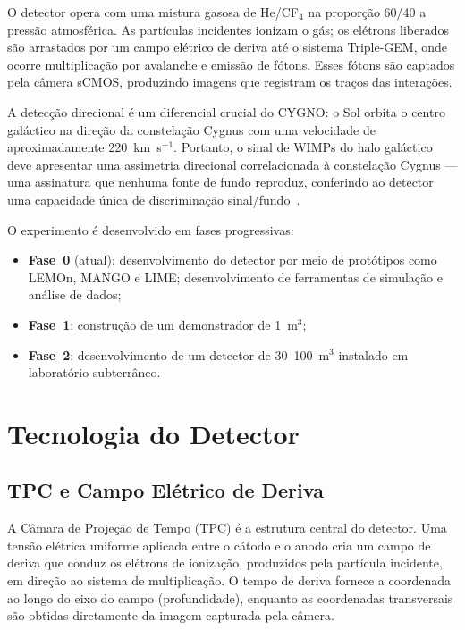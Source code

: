 \documentclass[
       oneside,
       english,
       brazil
       ]{abntbibufjf}
\begin{document}
O detector opera com uma mistura gasosa de He/CF$_4$ na proporção 60/40 a
pressão atmosférica. As partículas incidentes ionizam o gás; os elétrons
liberados são arrastados por um campo elétrico de deriva até o sistema
Triple-GEM, onde ocorre multiplicação por avalanche e emissão de fótons. Esses
fótons são captados pela câmera sCMOS, produzindo imagens que registram os
traços das interações.

A detecção direcional é um diferencial crucial do CYGNO: o Sol orbita o centro
galáctico na direção da constelação Cygnus com uma velocidade de
aproximadamente 220~km~s$^{-1}$. Portanto, o sinal de WIMPs do halo galáctico
deve apresentar uma assimetria direcional correlacionada à constelação Cygnus
— uma assinatura que nenhuma fonte de fundo reproduz, conferindo ao detector
uma capacidade única de discriminação sinal/fundo~\cite{bib:eps}.

O experimento é desenvolvido em fases progressivas:
\begin{itemize}
    \item \textbf{Fase~0} (atual): desenvolvimento do detector por meio de
    protótipos como LEMOn, MANGO e LIME; desenvolvimento de ferramentas de
    simulação e análise de dados;
    \item \textbf{Fase~1}: construção de um demonstrador de 1~m$^3$;
    \item \textbf{Fase~2}: desenvolvimento de um detector de 30--100~m$^3$
    instalado em laboratório subterrâneo.
\end{itemize}

\section{Tecnologia do Detector}
\label{sec:technology}

\subsection{TPC e Campo Elétrico de Deriva}

A Câmara de Projeção de Tempo (TPC) é a estrutura central do detector. Uma
tensão elétrica uniforme aplicada entre o cátodo e o anodo cria um campo de
deriva que conduz os elétrons de ionização, produzidos pela partícula
incidente, em direção ao sistema de multiplicação. O tempo de deriva fornece a
coordenada ao longo do eixo do campo (profundidade), enquanto as coordenadas
transversais são obtidas diretamente da imagem capturada pela câmera.
\end{document}
